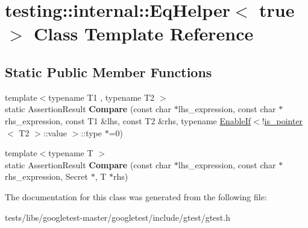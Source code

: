 \hypertarget{classtesting_1_1internal_1_1EqHelper_3_01true_01_4}{}\section{testing\+:\+:internal\+:\+:Eq\+Helper$<$ true $>$ Class Template Reference}
\label{classtesting_1_1internal_1_1EqHelper_3_01true_01_4}
\subsection*{Static Public Member Functions}
\begin{DoxyCompactItemize}
\item 
\mbox{\label{classtesting_1_1internal_1_1EqHelper_3_01true_01_4_a12c7194b2a210b61f06c912eef484ca6}} 
{\footnotesize template$<$typename T1 , typename T2 $>$ }\\static Assertion\+Result {\bfseries Compare} (const char $\ast$lhs\+\_\+expression, const char $\ast$rhs\+\_\+expression, const T1 \&lhs, const T2 \&rhs, typename \hyperlink{structtesting_1_1internal_1_1EnableIf}{Enable\+If}$<$!\hyperlink{structtesting_1_1internal_1_1is__pointer}{is\+\_\+pointer}$<$ T2 $>$\+::value $>$\+::type $\ast$=0)
\item 
\mbox{\label{classtesting_1_1internal_1_1EqHelper_3_01true_01_4_a6f292601a68c8f0d49e6d48bd309b900}} 
{\footnotesize template$<$typename T $>$ }\\static Assertion\+Result {\bfseries Compare} (const char $\ast$lhs\+\_\+expression, const char $\ast$rhs\+\_\+expression, Secret $\ast$, T $\ast$rhs)
\end{DoxyCompactItemize}


The documentation for this class was generated from the following file\+:\begin{DoxyCompactItemize}
\item 
tests/libs/googletest-\/master/googletest/include/gtest/gtest.\+h\end{DoxyCompactItemize}
